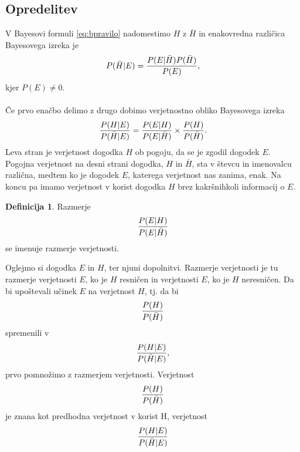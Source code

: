 \documentclass[12pt,a4paper]{amsart}
\theoremstyle{definition} %
\newtheorem{definicija}{Definicija}[section]
\theoremstyle{plain} %
\begin{document}
\subsection{Opredelitev}
V Bayesovi formuli \eqref{eq:bpravilo} nadomestimo $H$ z $\bar{H}$ in enakovredna različica Bayesovega izreka je
\begin{equation}
   P(\bar{H} \lvert E) = \frac{P(E \lvert \bar{H})P(\bar{H})}{P(E)}, \vspace{2mm}
\end{equation}
kjer $P(E) \ne 0$.\\\\
Če prvo enačbo delimo z drugo dobimo verjetnostno obliko Bayesovega izreka
\begin{equation}
   \frac{P(H \lvert E)}{P(\bar{H} \lvert E)} = \frac{P(E \lvert H)}{P(E \lvert \bar{H})} \times \frac{P(H)}{P(\bar{H})}. \vspace{2mm}
\end{equation}
Leva stran je verjetnost dogodka $H$ ob pogoju, da se je zgodil dogodek $E$. Pogojna verjetnost na desni strani dogodka, $H$ in $\bar{H}$,
sta v števcu in imenovalcu različna, medtem ko je dogodek $E$, katerega verjetnost nas zanima, enak. Na koncu pa imamo verjetnost v
korist dogodka $H$ brez kakršnihkoli informacij o $E$.\\
\begin{definicija}
   Razmerje
   \begin{equation}
       \frac{P(E \lvert H)}{P(E \lvert \bar{H})} \vspace{2mm}
   \end{equation}
    se imenuje razmerje verjetnosti. \\
\end{definicija}
Oglejmo si dogodka $E$ in $H$, ter njuni dopolnitvi. Razmerje verjetnosti je tu razmerje verjetnosti $E$, ko je $H$ resničen in verjetnosti $E$,
ko je $H$ neresničen. Da bi upoštevali učinek $E$ na verjetnost $H$, tj. da bi
\[
   \frac{P(H)}{P(\bar{H})} \vspace{2mm}
\]
spremenili v
\[
   \frac{P(H \lvert E)}{P(\bar{H} \lvert E)}, \vspace{2mm}
\]
prvo pomnožimo z razmerjem verjetnosti. Verjetnost
\[
   \frac{P(H)}{P(\bar{H})} \vspace{2mm}
\]
je znana kot predhodna verjetnost v korist H, verjetnost
\[
   \frac{P(H \lvert E)}{P(\bar{H} \lvert E)} \vspace{2mm}
\]
\end{document}
